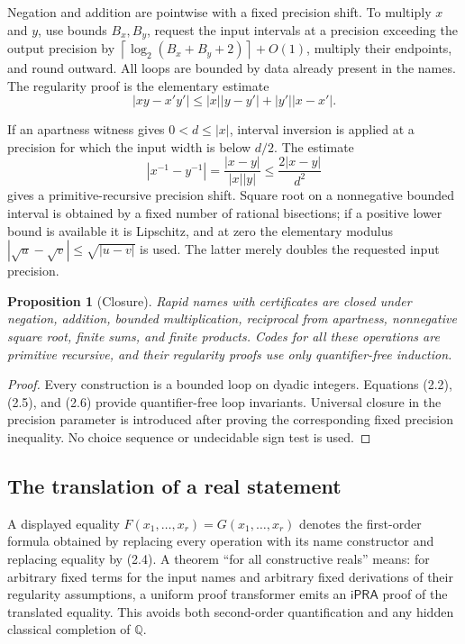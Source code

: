 \documentclass[11pt]{article}
\newtheorem{proposition}[theorem]{Proposition}
\theoremstyle{definition}
\newcommand{\Q}{\mathbb Q}
\newcommand{\iPRA}{\mathsf{iPRA}}
\newcommand{\abs}[1]{\left|#1\right|}
\newcommand{\ceil}[1]{\left\lceil#1\right\rceil}
\newcommand{\code}[1]{\texttt{\detokenize{#1}}}
\begin{document}
Negation and addition are pointwise with a fixed precision shift.  To multiply
\(x\) and \(y\), use bounds \(B_x,B_y\), request the input intervals at a
precision exceeding the output precision by
\(\ceil{\log_2(B_x+B_y+2)}+O(1)\), multiply their endpoints, and round outward.
All loops are bounded by data already present in the names.  The regularity
proof is the elementary estimate
\[
 \abs{xy-x'y'}\le \abs{x}\abs{y-y'}+\abs{y'}\abs{x-x'}.
 \tag{2.5}
\]

If an apartness witness gives \(0<d\le\abs{x}\), interval inversion is applied
at a precision for which the input width is below \(d/2\).  The estimate
\[
 \abs{x^{-1}-y^{-1}}=\frac{\abs{x-y}}{\abs{x}\abs{y}}
 \le \frac{2\abs{x-y}}{d^2}
 \tag{2.6}
\]
gives a primitive-recursive precision shift.  Square root on a nonnegative
bounded interval is obtained by a fixed number of rational bisections; if a
positive lower bound is available it is Lipschitz, and at zero the elementary
modulus \(\abs{\sqrt u-\sqrt v}\le\sqrt{\abs{u-v}}\) is used.  The latter merely
doubles the requested input precision.

\begin{proposition}[Closure]
Rapid names with certificates are closed under negation, addition, bounded
multiplication, reciprocal from apartness, nonnegative square root, finite sums,
and finite products.  Codes for all these operations are primitive recursive,
and their regularity proofs use only quantifier-free induction.
\end{proposition}

\begin{proof}
Every construction is a bounded loop on dyadic integers.  Equations (2.2),
(2.5), and (2.6) provide quantifier-free loop invariants.  Universal closure in
the precision parameter is introduced after proving the corresponding fixed
precision inequality.  No choice sequence or undecidable sign test is used.
\end{proof}

\subsection{The translation of a real statement}

A displayed equality \(F(x_1,\ldots,x_r)=G(x_1,\ldots,x_r)\) denotes the
first-order formula obtained by replacing every operation with its name
constructor and replacing equality by (2.4).  A theorem ``for all constructive
reals'' means: for arbitrary fixed \code{PR} terms for the input names and
arbitrary fixed derivations of their regularity assumptions, a uniform proof
transformer emits an \(\iPRA\) proof of the translated equality.  This avoids
both second-order quantification and any hidden classical completion of \(\Q\).
\end{document}
